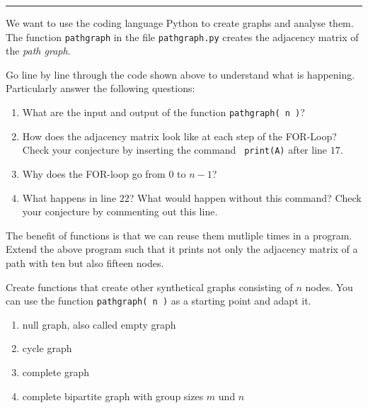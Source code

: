 



  \sheet[%
  number=1,
      topic={Introduction to Network Theory},
    ]

\vspace{-1cm}
\noindent\rule{12cm}{0.4pt}

  \exercise[%
  topic = Create Graphs with Python
    ]

We want to use the coding language Python to create graphs and analyse them. The function {\tt pathgraph} in the file {\tt pathgraph.py} creates the adjacency matrix of the \emph{path graph}.

  




 \subexercise[%
  topic=Understanding the Program and Adapting it,
    ]

Go line by line through the code shown above to understand what is happening. Particularly answer the following questions:

\begin{enumerate}
\item What are the input and output of the function {\tt pathgraph( n )}?
\item How does the adjacency matrix look like at each step of the
    FOR-Loop? Check your conjecture by inserting the command {\tt
        print(A)} after line $17$.
\item Why does the FOR-loop go from $0$ to $n-1$?
\item What happens in line $22$? What would happen without this command?
    Check your conjecture by commenting out this line.
\end{enumerate}

The benefit of functions is that we can reuse them mutliple times in a program. Extend the above program such that it prints not only the adjacency matrix of a path with ten but also fifteen nodes.

 \subexercise[%
  topic=Creating Graphs,
    ] \label{subex:creating}

Create functions that create other synthetical graphs consisting of $n$ nodes. You can use the function {\tt pathgraph( n )} as a starting point and adapt it.

\begin{enumerate}
\item null graph, also called empty graph
\item cycle graph
\item complete graph
\item complete bipartite graph with group sizes $m$ und $n$
\end{enumerate}


